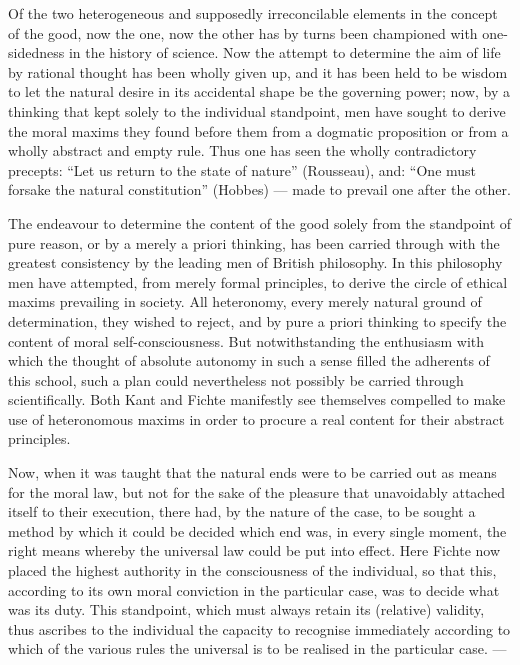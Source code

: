 \documentclass[12pt]{article}
\newcommand{\opage}[1]{\marginnote{\footnotesize\textit{[#1]}}}
\begin{document}
Of the two heterogeneous and supposedly irreconcilable elements in the concept of the good, now the one, now the other has by turns been championed with one-sidedness in the history of science. Now the attempt to determine the aim of life by rational thought has been wholly given up, and it has been held to be wisdom to let the natural desire in its accidental shape be the governing power; now, by a thinking that kept solely to the individual standpoint, men have sought to derive the moral maxims they found before them from a dogmatic proposition or from a wholly abstract and empty rule. Thus one has seen the wholly contradictory precepts: ``Let us return to the state of nature'' (Rousseau), and: ``One must forsake the natural constitution'' (Hobbes) --- made to prevail one after the other.

The endeavour to determine the content of the good solely from the standpoint of pure reason, or by a merely a priori thinking, has been carried through with the greatest consistency by the leading men of British philosophy. In this philosophy men have attempted, from merely formal principles, to derive the circle of ethical maxims prevailing in society. All heteronomy, every merely natural ground of determination, they wished to reject, and by pure \opage{154}a priori thinking to specify the content of moral self-consciousness. But notwithstanding the enthusiasm with which the thought of absolute autonomy in such a sense filled the adherents of this school, such a plan could nevertheless not possibly be carried through scientifically. Both Kant and Fichte manifestly see themselves compelled to make use of heteronomous maxims in order to procure a real content for their abstract principles.

Now, when it was taught that the natural ends were to be carried out as means for the moral law, but not for the sake of the pleasure that unavoidably attached itself to their execution, there had, by the nature of the case, to be sought a method by which it could be decided which end was, in every single moment, the right means whereby the universal law could be put into effect. Here Fichte now placed the highest authority in the consciousness of the individual, so that this, according to its own moral conviction in the particular case, was to decide what was its duty. This standpoint, which must always retain its (relative) validity, thus ascribes to the individual the capacity to recognise immediately according to which of the various rules the universal is to be realised in the particular case. ---
\end{document}
